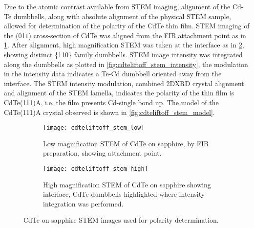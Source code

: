 Due to the atomic contrast available from STEM imaging, alignment of the Cd-Te dumbbells, along with absolute alignment of the physical STEM sample, allowed for determination of the polarity of the CdTe thin film.
STEM imaging of the (01\(\overline{1}\)) cross-section of CdTe was aligned from the FIB attachment point as in \cref{fig:cdteliftoff_stem_low}.
After alignment, high magnification STEM was taken at the interface as in \cref{fig:cdteliftoff_stem_high}, showing distinct \{110\} family dumbbells.
STEM image intensity was integrated along the dumbbells as plotted in \cref{fig:cdteliftoff_stem_intensity}, the modulation in the intensity data indicates a Te-Cd dumbbell oriented away from the interface.
The STEM intensity modulation, combined 2DXRD crystal alignment and alignment of the STEM lamella, indicates the polarity of the thin film is CdTe(111)A, i.e. the film presents Cd-single bond up.
The model of the CdTe(111)A crystal observed is shown in \cref{fig:cdteliftoff_stem_model}.
\begin{figure}
    \centering
    \begin{subfigure}[t]{0.47\textwidth}
        \centering \texttt{[image: cdteliftoff\_stem\_low]}
        \caption{\label{fig:cdteliftoff_stem_low}Low magnification STEM of CdTe on sapphire, by FIB preparation, showing attachment point.}
    \end{subfigure}\quad%
    \begin{subfigure}[t]{0.47\textwidth}
        \centering \texttt{[image: cdteliftoff\_stem\_high]}
        \caption{\label{fig:cdteliftoff_stem_high}High magnification STEM of CdTe on sapphire showing interface, CdTe dumbbells highlighted where intensity integration was performed.}
    \end{subfigure}%
    \caption{\label{fig:cdteliftoff_stem}CdTe on sapphire STEM images used for polarity determination.}
\end{figure}

